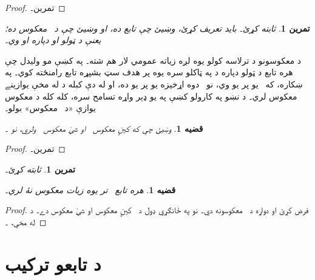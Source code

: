 \documentclass[12pt,a4paper,oneside]{report}
\newcommand{\ran}[1]{\mathrm{ran}(#1)}
\newcommand{\olfileid}[3]{\gdef\pspart{#1}\gdef\pschapter{#2}\gdef\pssection{#3}}
\newcommand{\olsection}[1]{\section{#1}\label{\pspart:\pschapter:\pssection:sec}}
\newcommand{\ollabel}[1]{\label{\pspart:\pschapter:\pssection:#1}}
\newenvironment{explain}{}{}
\newtheorem{prop}[defn]{قضيه}
\newtheorem{prob}[defn]{تمرين}
\begin{document}
\begin{proof}
تمرين۔
\end{proof}

\begin{prob}
 ثابته کړئ۔ بايد
 تعريف کړئ، وښيئ چې تابع ده، او وښيئ چې د~ معکوس
ده؛ يعنې د ټولو  او  دپاره 
او  وي۔
\end{prob}

\begin{explain}
د معکوسونو د ترلاسه کولو يوه لږه زياته عمومي لار هم شته۔ په
 کښې مو وليدل چې هره تابع  د ټولو 
دپاره د  په ټاکلو سره يوه پر هدف سټ بشپړه تابع
\LR{$f' \colon A \to \ran{f}$} رامنځته کوي۔ په ښکاره، که~
يو پر يو وي، نو~ دوه اړخيزه يو پر يو ده، او له دې کبله د
 له مخې يوازينے معکوس لري۔ د نښو
په کارولو کښې په يو ډېر واړه تسامح سره، کله کله د  معکوس
يوازې «د~ معکوس» بولو۔
\end{explain}

\begin{prop}\ollabel{prop:left-right}%
  وښيئ چې که  کيڼ معکوس~ او ښي معکوس~
  ولري، نو ۔
\end{prop}

\begin{proof}
  تمرين۔
\end{proof}

\begin{prob}
   ثابته کړئ۔
\end{prob}

\begin{prop}\ollabel{prop:inverse-unique}
هره تابع~ تر يوه زيات معکوس نۀ لري۔
\end{prop}

\begin{proof}
  فرض کړئ  او  دواړه د~ معکوسونه دي۔ نو په ځانګړي ډول
   د~ کيڼ معکوس او  ښي معکوس دے۔ د
   له مخې، ۔
\end{proof}




\olfileid{sfr}{fun}{cmp}
\olsection{د تابعو ترکيب}
\end{document}

